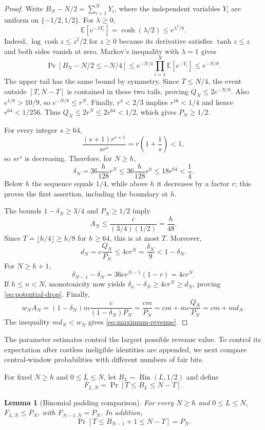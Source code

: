 \documentclass[11pt]{article}
\newtheorem{lemma}{Lemma}[section]
\begin{document}
\begin{proof}
Write $B_N-N/2=\sum_{i=1}^N Y_i$, where the independent variables $Y_i$ are
uniform on $\{-1/2,1/2\}$.  For $\lambda\ge0$,
\[
\mathbb{E}[e^{-\lambda Y_i}]=\cosh(\lambda/2)
\le e^{\lambda^2/8}.
\]
Indeed, $\log\cosh z\le z^2/2$ for $z\ge0$ because its derivative satisfies
$\tanh z\le z$ and both sides vanish at zero.  Markov's inequality with
$\lambda=1$ gives
\[
\Pr[B_N-N/2\le-N/4]
\le e^{-N/4}\prod_{i=1}^N\mathbb{E}[e^{-Y_i}]
\le e^{-N/8}.
\]
The upper tail has the same bound by symmetry.  Since $T\le N/4$, the event
outside $[T,N-T]$ is contained in these two tails, proving
$Q_N\le2e^{-N/8}$.  Also $e^{1/8}>10/9$, so $e^{-N/8}\le r^N$.  Finally,
$r^4<2/3$ implies $r^{16}<1/4$ and hence $r^{64}<1/256$.  Thus
$Q_N\le2r^N\le2r^{64}<1/2$, which gives $P_N\ge1/2$.

For every integer $s\ge64$,
\[
\frac{(s+1)r^{s+1}}{sr^s}=r\left(1+\frac1s\right)<1,
\]
so $sr^s$ is decreasing.  Therefore, for $N\ge h$,
\[
\delta_N=36\frac h{128}r^N
\le36\frac h{128}r^h
\le18r^{64}<\frac14.
\]
Below $h$ the sequence equals $1/4$, while above $h$ it decreases by a factor
$r$; this proves the first assertion, including the boundary at $h$.

The bounds $1-\delta_N\ge3/4$ and $P_N\ge1/2$ imply
\[
A_N\le\frac{c}{(3/4)(1/2)}=\frac h{48}.
\]
Since $T=\lfloor h/4\rfloor\ge h/8$ for $h\ge64$, this is at most $T$.
Moreover,
\[
d_N=c\frac{Q_N}{P_N}\le4cr^N=\frac{\delta_N}{9}
<1-\delta_N.
\]
For $N\ge h+1$,
\[
\delta_{N-1}-\delta_N
=36cr^{N-1}(1-r)=4cr^N.
\]
If $h\le n<N$, monotonicity now yields
$\delta_n-\delta_N\ge4cr^N\ge d_N$, proving
\eqref{eq:potential-drop}.  Finally,
\[
w_NA_N=(1-\delta_N)m\frac{c}{(1-\delta_N)P_N}
=\frac{cm}{P_N}=cm+mc\frac{Q_N}{P_N}=cm+md_N.
\]
The inequality $md_N<w_N$ gives \eqref{eq:maximum-revenue}.
\end{proof}

The parameter estimates control the largest possible revenue value.  To
control its expectation after costless ineligible identities are appended, we
next compare central-window probabilities with different numbers of fair
bits.

For fixed $N\ge h$ and $0\le L\le N$, let
$B_L\sim\operatorname{Bin}(L,1/2)$ and define
\begin{equation}
F_{L,N}=\Pr[T\le B_L\le N-T].
\label{eq:padding-probability}
\end{equation}

\begin{lemma}[Binomial padding comparison]
\label{lem:binomial-padding}
For every $N\ge h$ and $0\le L\le N$,
$F_{L,N}\le P_N$, with $F_{N-1,N}=P_N$.  In addition,
\[
\Pr[T\le B_{N-1}+1\le N-T]=P_N.
\]
\end{lemma}
\end{document}
